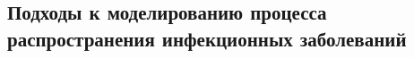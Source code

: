 \newpage
\parindent=1cm %
\begin{center}
		
		\section{Подходы к моделированию процесса распространения инфекционных заболеваний}
		
\end{center}